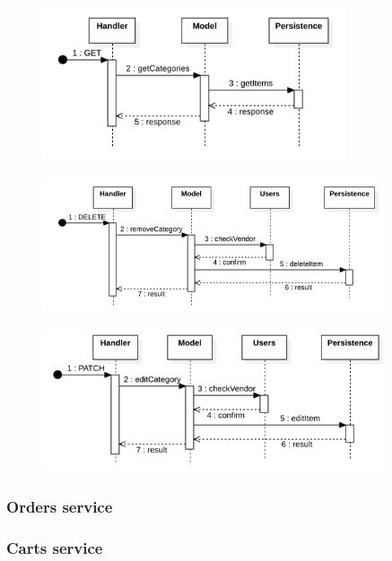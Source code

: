 \begin{figure}[H]
    \includegraphics[width=0.8\textwidth]{res/images/sequence-diagrams/categories/getCategories.png}
\end{figure}

\begin{figure}[H]
    \includegraphics[width=0.9\textwidth]{res/images/sequence-diagrams/categories/removeCategory.png}
\end{figure}

\begin{figure}[H]
    \includegraphics[width=0.9\textwidth]{res/images/sequence-diagrams/categories/updateCategory.png}
\end{figure}

\subsubsection{Orders service}


\subsubsection{Carts service}


